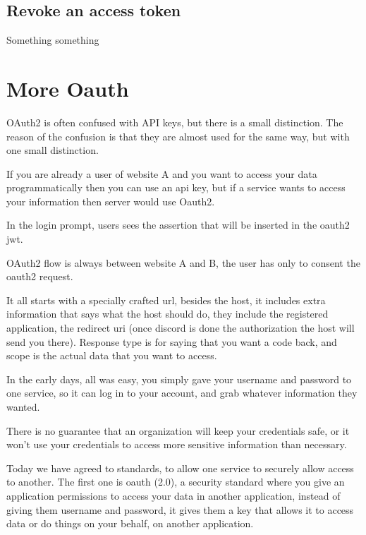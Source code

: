 \documentclass{style}
\begin{document}
\subsection{Revoke an access token}
Something something



\section{More Oauth}
OAuth2 is often confused with API keys, but there is a small distinction. The
reason of the confusion is that they are almost used for the same way, but with
one small distinction.

If you are already a user of website A and you want to access your data
programmatically then you can use an api key, but if a service wants to access
your information then server would use Oauth2.

In the login prompt, users sees the assertion that will be inserted in the
oauth2 jwt.

OAuth2 flow is always between website A and B, the user has only to consent the
oauth2 request.

It all starts with a specially crafted url, besides the host, it includes extra
information that says what the host should do, they include the registered
application, the redirect uri (once discord is done the authorization the host
will send you there). Response type is for saying that you want a code back, and
scope is the actual data that you want to access.

In the early days, all was easy, you simply gave your username and password to
one service, so it can log in to your account, and grab whatever information
they wanted.

There is no guarantee that an organization will keep your credentials safe, or
it won't use your credentials to access more sensitive information than
necessary.

Today we have agreed to standards, to allow one service to securely allow access
to another.
The first one is oauth (2.0), a security standard where you give an application
permissions to access your data in another application, instead of giving them
username and password, it gives them a key that allows it to access data or do
things on your behalf, on another application.
\end{document}
